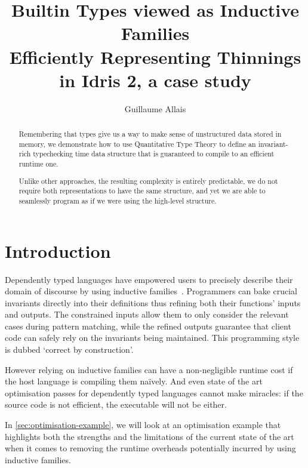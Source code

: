 \documentclass{article}
\newcommand{\idris}{Idris 2}
\begin{document}
\title{Builtin Types viewed as Inductive Families \\
{\large Efficiently Representing Thinnings in \idris, a case study}}
\author{Guillaume Allais}

\maketitle

\begin{abstract}
  Remembering that types give us a way to make sense of unstructured data stored
  in memory, we demonstrate how to use Quantitative Type Theory to define an
  invariant-rich typechecking time data structure that is guaranteed to compile
  to an efficient runtime one.

  Unlike other approaches, the resulting complexity is entirely predictable, we do
  not require both representations to have the same structure, and yet we are able
  to seamlessly program as if we were using the high-level structure.
\end{abstract}


\section{Introduction}

Dependently typed languages have empowered users to precisely describe their domain
of discourse by using inductive families~\cite{DBLP:journals/fac/Dybjer94}.
%
Programmers can bake crucial invariants directly into their definitions thus refining
both their functions' inputs and outputs.
%
The constrained inputs allow them to only consider the relevant cases during pattern
matching, while the refined outputs guarantee that client code can safely rely on the
invariants being maintained.
%
This programming style is dubbed `correct by construction'.

However relying on inductive families can have a non-negligible runtime cost if
the host language is compiling them naïvely. And even state of the art optimisation
passes for dependently typed languages cannot make miracles: if the source code is
not efficient, the executable will not be either.

In \cref{sec:optimisation-example}, we will look at an optimisation example
that highlights both the strengths and the limitations of the current state
of the art when it comes to removing the runtime overheads potentially
incurred by using inductive families.
\end{document}

